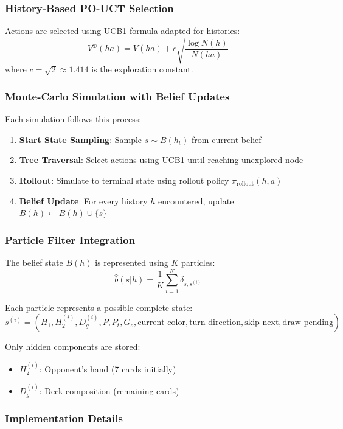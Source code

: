 \documentclass[journal,transmag]{IEEEtran}
\begin{document}
\subsubsection{History-Based PO-UCT Selection}
Actions are selected using UCB1 formula adapted for histories:
\[
V^{\oplus}(ha) = V(ha) + c\sqrt{\frac{\log N(h)}{N(ha)}}
\]
where $c = \sqrt{2} \approx 1.414$ is the exploration constant.

\subsubsection{Monte-Carlo Simulation with Belief Updates}

Each simulation follows this process:
\begin{enumerate}
    \item \textbf{Start State Sampling}: Sample $s \sim B(h_t)$ from current belief
    \item \textbf{Tree Traversal}: Select actions using UCB1 until reaching unexplored node
    \item \textbf{Rollout}: Simulate to terminal state using rollout policy $\pi_{\text{rollout}}(h,a)$
    \item \textbf{Belief Update}: For every history $h$ encountered, update $B(h) \leftarrow B(h) \cup \{s\}$
\end{enumerate}

\subsubsection{Particle Filter Integration}

The belief state $B(h)$ is represented using $K$ particles:
\[
\hat{b}(s|h) = \frac{1}{K} \sum_{i=1}^{K} \delta_{s,s^{(i)}}
\]

Each particle represents a possible complete state:
\[
s^{(i)} = (H_1, H_2^{(i)}, D_g^{(i)}, P, P_t, G_o, \text{current\_color}, \text{turn\_direction}, \text{skip\_next}, \text{draw\_pending})
\]

Only hidden components are stored:
\begin{itemize}
    \item $H_2^{(i)}$: Opponent's hand (7 cards initially)
    \item $D_g^{(i)}$: Deck composition (remaining cards)
\end{itemize}

\subsubsection{Implementation Details}
\end{document}
